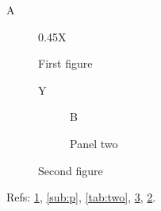 \documentclass{article}
\begin{document}
\begin{table}A\caption{First table}\end{table}
\begin{figure}
  \begin{subtable}{0.45\textwidth}X\caption{Panel}\label{sub:p}\end{subtable}
  \caption{First figure}\label{fig:one}
\end{figure}
\begin{table}
  \begin{subfigure}{0.45\textwidth}Y\end{subfigure}
  \caption{Second table}\label{tab:two}
\end{table}
\begin{figure}
  \begin{subfigure}{0.45\textwidth}B\caption{Panel two}\label{sub:q}\end{subfigure}
  \caption{Second figure}\label{fig:two}
\end{figure}
Refs: \ref{fig:one}, \ref{sub:p}, \ref{tab:two}, \ref{fig:two}, \ref{sub:q}.
\end{document}
